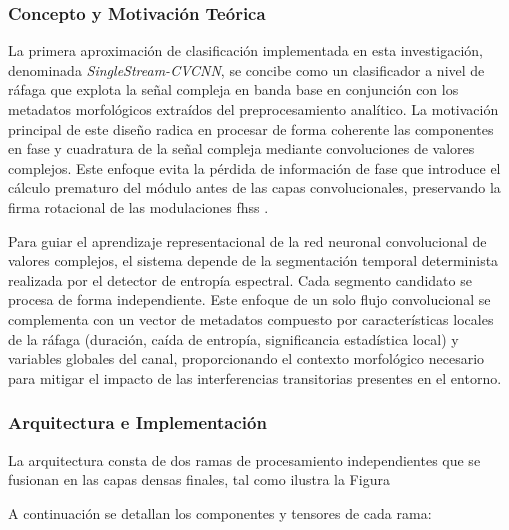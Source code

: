 \subsubsection{Concepto y Motivación Teórica}
La primera aproximación de clasificación implementada en esta investigación, denominada \textit{SingleStream-CVCNN}, se concibe como un clasificador a nivel de ráfaga que explota la señal compleja en banda base en conjunción con los metadatos morfológicos extraídos del preprocesamiento analítico. La motivación principal de este diseño radica en procesar de forma coherente las componentes en fase y cuadratura de la señal compleja mediante convoluciones de valores complejos. Este enfoque evita la pérdida de información de fase que introduce el cálculo prematuro del módulo antes de las capas convolucionales, preservando la firma rotacional de las modulaciones \gls{fhss} \cite{trabelsi_deep_2018}.

Para guiar el aprendizaje representacional de la red neuronal convolucional de valores complejos, el sistema depende de la segmentación temporal determinista realizada por el detector de entropía espectral. Cada segmento candidato se procesa de forma independiente. Este enfoque de un solo flujo convolucional se complementa con un vector de metadatos compuesto por características locales de la ráfaga (duración, caída de entropía, significancia estadística local) y variables globales del canal, proporcionando el contexto morfológico necesario para mitigar el impacto de las interferencias transitorias presentes en el entorno.

\subsubsection{Arquitectura e Implementación}
La arquitectura consta de dos ramas de procesamiento independientes que se fusionan en las capas densas finales, tal como ilustra la Figura %

A continuación se detallan los componentes y tensores de cada rama:

